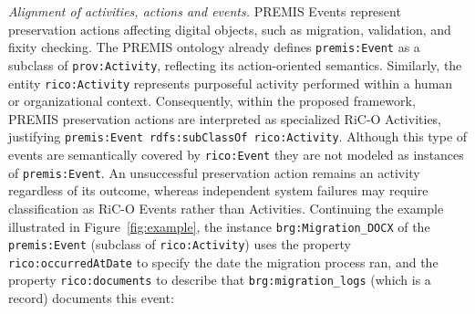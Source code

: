 \documentclass[runningheads]{llncs}
\begin{document}
\emph{Alignment of activities, actions and events.}
PREMIS Events represent preservation actions affecting digital objects, such as migration, validation, and fixity checking. The PREMIS ontology already defines \texttt{premis:Event} as a subclass of \texttt{prov:Activity}, reflecting its action-oriented semantics. Similarly, the entity \texttt{rico:Activity} represents purposeful activity performed within a human or organizational context. Consequently, within the proposed framework, PREMIS preservation actions are interpreted as specialized RiC-O Activities, justifying \texttt{premis:Event rdfs:subClassOf rico:Activity}. Although this type of events are semantically covered by \texttt{rico:Event} they are not modeled as instances of \texttt{premis:Event}.
An unsuccessful preservation action remains an activity regardless of its outcome, whereas independent system failures may require classification as RiC-O Events rather than Activities.
Continuing the example illustrated in Figure~\ref{fig:example}, the instance \texttt{brg:Migration\_DOCX} of the \texttt{premis:Event} (subclass of \texttt{rico:Activity}) uses the property \texttt{rico:occurredAtDate} to specify the date the migration process ran, and the property \texttt{rico:documents} to describe that  \texttt{brg:migration\_logs} (which is a record) documents this event:
\end{document}
